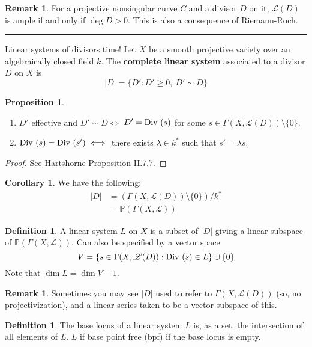 \documentclass[10pt,reqno]{amsart}
\theoremstyle{definition}
\newtheorem{corollary}[theorem]{Corollary}
\newtheorem{definition}[theorem]{Definition}
\newtheorem{proposition}[theorem]{Proposition}
\newtheorem{remark}[theorem]{Remark}
\theoremstyle{remark}
\numberwithin{equation}{section}
\numberwithin{theorem}{section}
\newcommand{\Div}{\textup{Div }}
\newcommand{\LL}{{\mathscr L}}
\newcommand{\PP}{{\mathbb P}}
\begin{document}
\begin{remark} For a projective nonsingular curve $C$ and a divisor $D$ on it, $\LL(D)$ is ample if and only if $\deg D > 0$. This is also a consequence of Riemann-Roch.
\end{remark}

\hrule
\vspace{1em}

Linear systems of divisors time! Let $X$ be a smooth projective variety over an algebraically closed field $k$. The \textbf{complete linear system} associated to a divisor $D$ on $X$ is
\[|D| = \{D' : D' \ge 0, \ D' \sim D\}\]

\begin{proposition}\text{ }
\begin{enumerate}
\item $D'$ effective and $D' \sim D \iff$ $D' = \Div(s)$ for some $s \in \Gamma(X,\LL(D)) \setminus \{0\}$.
\item $\Div(s) = \Div(s') \iff$ there exists $\lambda \in k^*$ such that $s' = \lambda s$.
\end{enumerate}
\end{proposition}
\begin{proof}
See Hartshorne Proposition II.7.7.
\end{proof}

\begin{corollary} We have the following:
\begin{align*}
|D| &= (\Gamma(X,\LL(D)) \setminus \{0\})/k^*\\
&= \PP(\Gamma(X,\LL))
\end{align*}
\end{corollary}

\begin{definition}
A linear system $L$ on $X$ is a subset of $|D|$ giving a linear subspace of $\PP(\Gamma(X,\LL))$. Can also be specified by a vector space
\[V = \{s \in \Gamma(X,\LL(D)) : \Div(s) \in L\} \cup \{0\}\]
Note that $\dim L = \dim V - 1$.
\end{definition}
\begin{remark}
Sometimes you may see $|D|$ used to refer to $\Gamma(X,\LL(D))$ (so, no projectivization), and a linear series taken to be a vector subspace of this. 
\end{remark}

\begin{definition}
The base locus of a linear system $L$ is, as a set, the intersection of all elements of $L$. $L$ if base point free (bpf) if the base locus is empty.
\end{definition}
\end{document}
